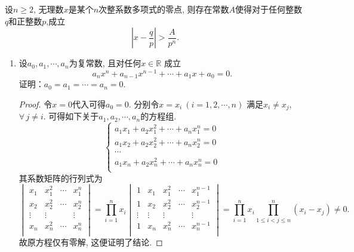 \begin{theorem}\label{C11}
    设\(n\geqslant 2\), 无理数\(x\)是某个\(n\)次整系数多项式的零点, 
    则存在常数\(A\)使得对于任何整数\(q\)和正整数\(p\),成立
    \[\left|x-\frac{q}{p}\right|>\frac{A}{p^n}.\]
\end{theorem}
\begin{1a}
\begin{enumerate}
\item[1.] 设\(a_0,a_1,\cdots,a_n\)为复常数, 且对任何\(x\in \mathbb{R}\) 成立 
 \[a_nx^n+a_{n-1}x^{n-1}+\cdots+a_1x+a_0=0.\]证明：\(a_0=a_1=\cdots=a_n=0\).
\begin{proof}
令\(x=0\)代入可得\(a_0=0\). 分别令\(x=x_i\ (i=1,2,\cdots,n)\)
满足\(x_i\ne x_j,\)\(\forall\,j\neq i\). 可得如下关于\(a_1,a_2,\cdots,a_n\)的方程组.
    \[\begin{cases}
        a_1x_1+a_2x_1^2+\cdots+a_nx^n_1=0\\
        a_1x_2+a_2x_2^2+\cdots+a_nx^n_2=0\\
        \cdots\\
        a_1x_n+a_2x_n^2+\cdots+a_nx^n_n=0\\
    \end{cases}\]
    其系数矩阵的行列式为
    \[\begin{vmatrix}
        x_1&x_1^2&\cdots&x_1^n\\
        x_2&x_2^2&\cdots&x_2^n\\
        \vdots&\vdots&&\vdots\\
        x_n&x_n^2&\cdots&x_n^n\\
    \end{vmatrix}=\prod_{i=1}^{n}x_i\begin{vmatrix}
        1&x_1&x_1^2&\cdots&x_1^{n-1}\\
        1&x_2&x_2^2&\cdots&x_2^{n-1}\\
        \vdots&\vdots&\vdots&&\vdots\\
        1&x_n&x_n^2&\cdots&x_n^{n-1}\\
    \end{vmatrix}=\prod_{i=1}^{n}x_i\prod_{1\leqslant i<j\leqslant n}^{n}(x_i-x_j)\ne 0.\]
    故原方程仅有零解, 这便证明了结论. 
        

\end{proof}
\end{enumerate}
\end{1a}
